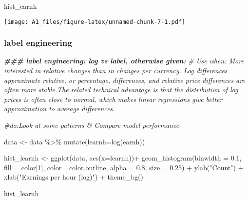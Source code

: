 \documentclass[
]{article}
\newenvironment{Shaded}{\begin{snugshade}}{\end{snugshade}}
\newcommand{\AttributeTok}[1]{\textcolor[rgb]{0.77,0.63,0.00}{#1}}
\newcommand{\CommentTok}[1]{\textcolor[rgb]{0.56,0.35,0.01}{\textit{#1}}}
\newcommand{\DecValTok}[1]{\textcolor[rgb]{0.00,0.00,0.81}{#1}}
\newcommand{\DocumentationTok}[1]{\textcolor[rgb]{0.56,0.35,0.01}{\textbf{\textit{#1}}}}
\newcommand{\FloatTok}[1]{\textcolor[rgb]{0.00,0.00,0.81}{#1}}
\newcommand{\FunctionTok}[1]{\textcolor[rgb]{0.00,0.00,0.00}{#1}}
\newcommand{\NormalTok}[1]{#1}
\newcommand{\OtherTok}[1]{\textcolor[rgb]{0.56,0.35,0.01}{#1}}
\newcommand{\SpecialCharTok}[1]{\textcolor[rgb]{0.00,0.00,0.00}{#1}}
\newcommand{\StringTok}[1]{\textcolor[rgb]{0.31,0.60,0.02}{#1}}
\begin{document}
\begin{Shaded}
\begin{Highlighting}[]
\NormalTok{hist\_earnh}
\end{Highlighting}
\end{Shaded}

\texttt{[image: A1\_files/figure-latex/unnamed-chunk-7-1.pdf]}

\hypertarget{label-engineering}{%
\subsubsection{label engineering}\label{label-engineering}}

\begin{Shaded}
\begin{Highlighting}[]
\DocumentationTok{\#\#\# label engineering: log vs label, otherwise given:}
\CommentTok{\# Use when: More interested in relative changes than in changes per currency. Log differences approximate relative, or percentage, differences, and relative price differences are often more stable.The related technical advantage is that the distribution of log prices is often close to normal, which makes linear regressions give better approximation to average differences.}

\CommentTok{\#do:Look at some patterns \& Compare model performance}

\NormalTok{data }\OtherTok{\textless{}{-}}\NormalTok{ data }\SpecialCharTok{\%\textgreater{}\%} \FunctionTok{mutate}\NormalTok{(}\AttributeTok{learnh=}\FunctionTok{log}\NormalTok{(earnh))}


\NormalTok{hist\_learnh }\OtherTok{\textless{}{-}} \FunctionTok{ggplot}\NormalTok{(data, }\FunctionTok{aes}\NormalTok{(}\AttributeTok{x=}\NormalTok{learnh))}\SpecialCharTok{+}
              \FunctionTok{geom\_histogram}\NormalTok{(}\AttributeTok{binwidth =} \FloatTok{0.1}\NormalTok{, }\AttributeTok{fill =}\NormalTok{ color[}\DecValTok{1}\NormalTok{], }\AttributeTok{color =}\NormalTok{color.outline, }\AttributeTok{alpha =} \FloatTok{0.8}\NormalTok{, }\AttributeTok{size =} \FloatTok{0.25}\NormalTok{) }\SpecialCharTok{+}
              \FunctionTok{ylab}\NormalTok{(}\StringTok{"Count"}\NormalTok{) }\SpecialCharTok{+}
              \FunctionTok{xlab}\NormalTok{(}\StringTok{"Earnings per hour (log)"}\NormalTok{) }\SpecialCharTok{+}
              \FunctionTok{theme\_bg}\NormalTok{()}

\NormalTok{hist\_learnh}
\end{Highlighting}
\end{Shaded}
\end{document}
